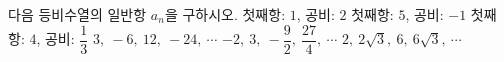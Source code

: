 다음 등비수열의 일반항 $a_n$을 구하시오.
 첫째항: $1$, 공비: $2$
 첫째항: $5$, 공비: $-1$
 첫째항: $4$, 공비: $\dfrac{1}{3}$
 $3,\ -6,\ 12,\ -24,\ \cdots$
 $-2,\ 3,\ -\dfrac{9}{2},\ \dfrac{27}{4},\ \cdots$
 $2,\ 2\sqrt{3},\ 6,\ 6\sqrt{3},\ \cdots$
